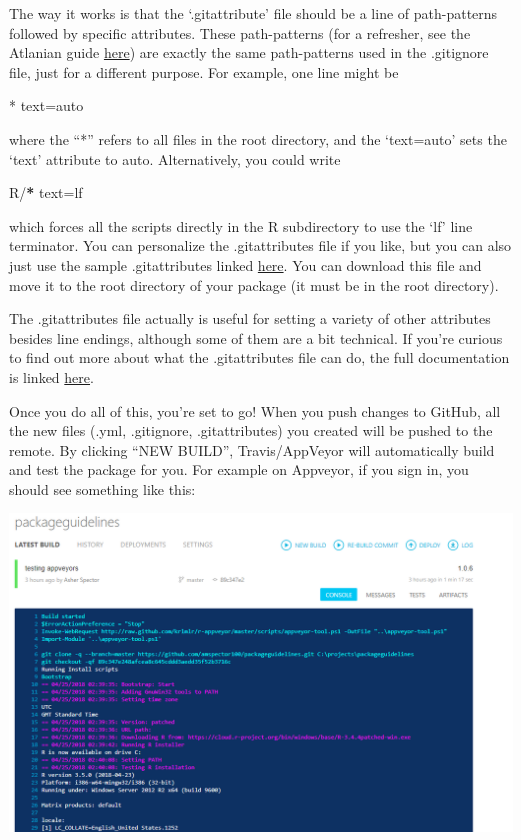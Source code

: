 \documentclass[
]{book}
\newenvironment{Shaded}{\begin{snugshade}}{\end{snugshade}}
\newcommand{\ErrorTok}[1]{\textcolor[rgb]{0.64,0.00,0.00}{\textbf{#1}}}
\newcommand{\NormalTok}[1]{#1}
\newcommand{\OtherTok}[1]{\textcolor[rgb]{0.56,0.35,0.01}{#1}}
\newcommand{\SpecialCharTok}[1]{\textcolor[rgb]{0.00,0.00,0.00}{#1}}
\begin{document}
The way it works is that the `.gitattribute' file should be a line of path-patterns followed by specific attributes. These path-patterns (for a refresher, see the Atlanian guide \href{https://www.atlassian.com/git/tutorials/saving-changes/gitignore}{here}) are exactly the same path-patterns used in the .gitignore file, just for a different purpose. For example, one line might be

\begin{Shaded}
\begin{Highlighting}[]
\SpecialCharTok{*}\NormalTok{ text}\OtherTok{=}\NormalTok{auto}
\end{Highlighting}
\end{Shaded}

where the ``*'' refers to all files in the root directory, and the `text=auto' sets the `text' attribute to auto. Alternatively, you could write

\begin{Shaded}
\begin{Highlighting}[]
\NormalTok{R}\SpecialCharTok{/}\ErrorTok{*}\NormalTok{ text}\OtherTok{=}\NormalTok{lf}
\end{Highlighting}
\end{Shaded}

which forces all the scripts directly in the R subdirectory to use the `lf' line terminator. You can personalize the .gitattributes file if you like, but you can also just use the sample .gitattributes linked \href{https://GitHub.com/krlmlr/r-appveyor/blob/master/.gitattributes}{here}. You can download this file and move it to the root directory of your package (it must be in the root directory).

The .gitattributes file actually is useful for setting a variety of other attributes besides line endings, although some of them are a bit technical. If you're curious to find out more about what the .gitattributes file can do, the full documentation is linked \href{https://git-scm.com/docs/gitattributes}{here}.

Once you do all of this, you're set to go! When you push changes to GitHub, all the new files (.yml, .gitignore, .gitattributes) you created will be pushed to the remote. By clicking ``NEW BUILD'', Travis/AppVeyor will automatically build and test the package for you. For example on Appveyor, if you sign in, you should see something like this:

\includegraphics{images/testSS/appveyor2.PNG}
\end{document}
